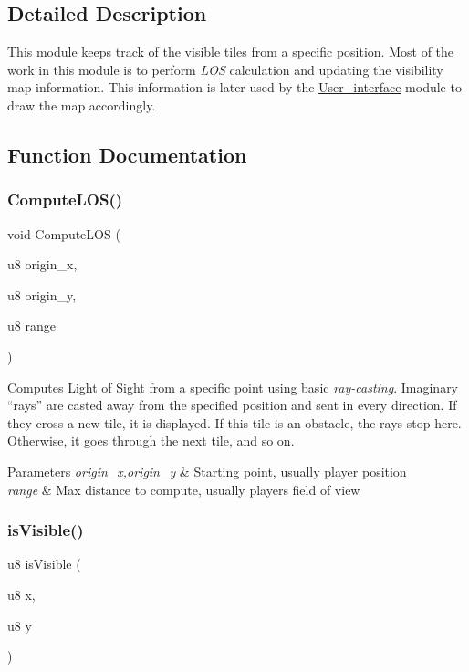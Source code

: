 \subsection{Detailed Description}
This module keeps track of the visible tiles from a specific position. Most of the work in this module is to perform {\itshape L\+OS} calculation and updating the visibility map information. This information is later used by the \mbox{\hyperlink{group__user__interface}{User\+\_\+interface}} module to draw the map accordingly. 

\subsection{Function Documentation}
\mbox{\label{group__fov_gad4147656708c4dad3847f926aa415563}} 
\subsubsection{\texorpdfstring{ComputeLOS()}{ComputeLOS()}}
{\footnotesize\ttfamily void Compute\+L\+OS (\begin{DoxyParamCaption}\item[{u8}]{origin\+\_\+x,  }\item[{u8}]{origin\+\_\+y,  }\item[{u8}]{range }\end{DoxyParamCaption})}

Computes Light of Sight from a specific point using basic {\itshape ray-\/casting}. Imaginary “rays” are casted away from the specified position and sent in every direction. If they cross a new tile, it is displayed. If this tile is an obstacle, the rays stop here. Otherwise, it goes through the next tile, and so on.


\begin{DoxyParams}{Parameters}
{\em origin\+\_\+x,origin\+\_\+y} & Starting point, usually player position \\
\hline
{\em range} & Max distance to compute, usually player\textquotesingle{}s field of view \\
\hline
\end{DoxyParams}
\mbox{\label{group__fov_ga131c45868e1d0ec18394f271b65a7db6}} 
\subsubsection{\texorpdfstring{isVisible()}{isVisible()}}
{\footnotesize\ttfamily u8 is\+Visible (\begin{DoxyParamCaption}\item[{u8}]{x,  }\item[{u8}]{y }\end{DoxyParamCaption})}


